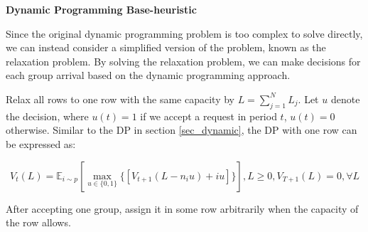 
{\bf{Dynamic Programming Base-heuristic}}

Since the original dynamic programming problem is too complex to solve directly, we can instead consider a simplified version of the problem, known as the relaxation problem. By solving the relaxation problem, we can make decisions for each group arrival based on the dynamic programming approach.


Relax all rows to one row with the same capacity by $L = \sum_{j=1}^{N} L_j$. Let $u$ denote the decision, where $u(t) = 1$ if we accept a request in period $t$, $u(t) =0$ otherwise. Similar to the DP in section \ref{sec_dynamic}, the DP with one row can be expressed as:

$$V_{t}(L) = \mathbb{E}_{i \sim p} [\max_{u \in \{0,1\}} \{ {[V_{t+1}(L-n_i u)+ i u]}\}], L \geq 0, V_{T+1}(L) =0, \forall L$$

After accepting one group, assign it in some row arbitrarily when the capacity of the row allows.


